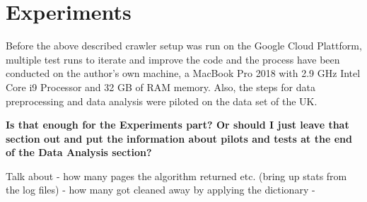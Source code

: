 \section{Experiments}
Before the above described crawler setup was run on the Google Cloud Plattform, multiple test runs to iterate and improve the code and the process have been conducted on the author's own machine, a MacBook Pro 2018 with 2.9 GHz Intel Core i9 Processor and 32 GB of RAM memory. Also, the steps for data preprocessing and data analysis were piloted on the data set of the UK.
\vspace{3pt}
\begin{center}
    \textbf{Is that enough for the Experiments part? Or should I just leave that section out and put the information about pilots and tests at the end of the Data Analysis section?}
\end{center}

Talk about 
- how many pages the algorithm returned etc. (bring up stats from the log files)
- how many got cleaned away by applying the dictionary 
- %
